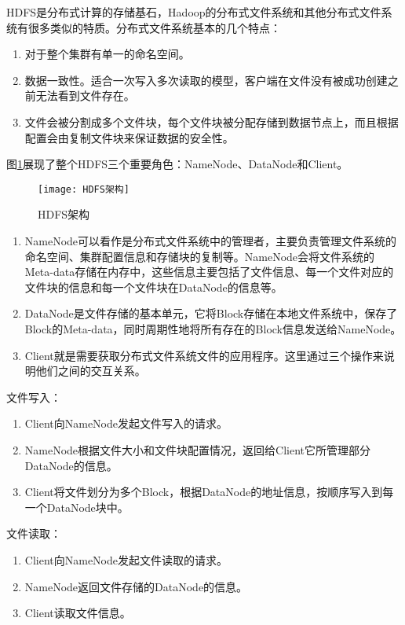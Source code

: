 HDFS是分布式计算的存储基石，Hadoop的分布式文件系统和其他分布式文件系统有很多类似的特质。分布式文件系统基本的几个特点：

\begin{enumerate}
\item 对于整个集群有单一的命名空间。
\item 数据一致性。适合一次写入多次读取的模型，客户端在文件没有被成功创建之前无法看到文件存在。
\item 文件会被分割成多个文件块，每个文件块被分配存储到数据节点上，而且根据配置会由复制文件块来保证数据的安全性。
\end{enumerate}

图\ref{fig:HDFS架构}展现了整个HDFS三个重要角色：NameNode、DataNode和Client。

\begin{figure}[h]
 \centering
 \texttt{[image: HDFS架构]}
 \caption{HDFS架构}
 \label{fig:HDFS架构}
\end{figure}

\begin{enumerate}
\item NameNode可以看作是分布式文件系统中的管理者，主要负责管理文件系统的命名空间、集群配置信息和存储块的复制等。NameNode会将文件系统的Meta-data存储在内存中，这些信息主要包括了文件信息、每一个文件对应的文件块的信息和每一个文件块在DataNode的信息等。
\item DataNode是文件存储的基本单元，它将Block存储在本地文件系统中，保存了Block的Meta-data，同时周期性地将所有存在的Block信息发送给NameNode。
\item Client就是需要获取分布式文件系统文件的应用程序。这里通过三个操作来说明他们之间的交互关系。
\end{enumerate}

文件写入：

\begin{enumerate}
\item Client向NameNode发起文件写入的请求。
\item NameNode根据文件大小和文件块配置情况，返回给Client它所管理部分DataNode的信息。
\item Client将文件划分为多个Block，根据DataNode的地址信息，按顺序写入到每一个DataNode块中。
\end{enumerate}

文件读取：

\begin{enumerate}
\item Client向NameNode发起文件读取的请求。
\item NameNode返回文件存储的DataNode的信息。
\item Client读取文件信息。
\end{enumerate}

